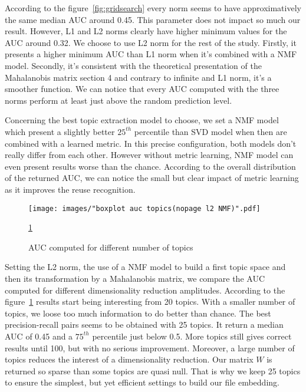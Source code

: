 \documentclass[a4paper]{article}
\begin{document}
	According to the figure~\ref{fig:gridsearch} every norm seems to have approximatively the same median \ac{AUC} around 0.45. This parameter does not impact so much our result. However, L1 and L2 norms clearly have higher minimum values for the \ac{AUC} around 0.32. We choose to use L2 norm for the rest of the study. Firstly, it presents a higher minimum \ac{AUC} than L1 norm when it's combined with a \ac{NMF} model. Secondly, it's consistent with the theoretical presentation of the Mahalanobis matrix section 4 and contrary to infinite and L1 norm, it's a smoother function. We can notice that every \ac{AUC} computed with the three norms perform at least just above the random prediction level.
	
	Concerning the best topic extraction model to choose, we set a \ac{NMF} model which present a slightly better $25^{th}$ percentile than \ac{SVD} model when then are combined with a learned metric. In this precise configuration, both models don't really differ from each other. However without metric learning, \ac{NMF} model can even present results worse than the chance. According to the overall distribution of the returned \ac{AUC}, we can notice the small but clear impact of metric learning as it improves the reuse recognition.
	
	\begin{figure}
		\centering
		\texttt{[image: images/"boxplot auc topics(nopage l2 NMF)".pdf]}
		\caption{AUC computed for different number of topics}
		\ref{fig:topics-comparison}
		\label{fig:topics-comparison}
	\end{figure}	
	
	Setting the L2 norm, the use of a \ac{NMF} model to build a first topic space and then its transformation by a Mahalanobis matrix, we compare the \ac{AUC} computed for different dimensionality reduction amplitudes. According to the figure~\ref{fig:topics-comparison} results start being interesting from 20 topics. With a smaller number of topics, we loose too much information to do better than chance. The best precision-recall pairs seems to be obtained with 25 topics. It return a median \ac{AUC} of 0.45 and a $75^{th}$ percentile just below 0.5. More topics still gives correct results until 100, but with no serious improvement. Moreover, a large number of topics reduces the interest of a dimensionality reduction. Our matrix $W$ is returned so sparse than some topics are quasi null. That is why we keep 25 topics to ensure the simplest, but yet efficient settings to build our file embedding.
	
\end{document}
